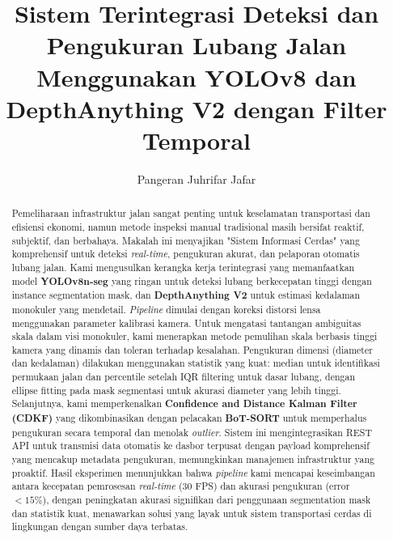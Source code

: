 \documentclass{iopjournal}
\begin{document}

\title{Sistem Terintegrasi Deteksi dan Pengukuran Lubang Jalan Menggunakan YOLOv8 dan DepthAnything V2 dengan Filter Temporal}

\author{Pangeran Juhrifar Jafar}


\begin{abstract}
Pemeliharaan infrastruktur jalan sangat penting untuk keselamatan transportasi dan efisiensi ekonomi, namun metode inspeksi manual tradisional masih bersifat reaktif, subjektif, dan berbahaya. Makalah ini menyajikan "Sistem Informasi Cerdas" yang komprehensif untuk deteksi \textit{real-time}, pengukuran akurat, dan pelaporan otomatis lubang jalan. Kami mengusulkan kerangka kerja terintegrasi yang memanfaatkan model \textbf{YOLOv8n-seg} yang ringan untuk deteksi lubang berkecepatan tinggi dengan instance segmentation mask, dan \textbf{DepthAnything V2} untuk estimasi kedalaman monokuler yang mendetail. \textit{Pipeline} dimulai dengan koreksi distorsi lensa menggunakan parameter kalibrasi kamera. Untuk mengatasi tantangan ambiguitas skala dalam visi monokuler, kami menerapkan metode pemulihan skala berbasis tinggi kamera yang dinamis dan toleran terhadap kesalahan. Pengukuran dimensi (diameter dan kedalaman) dilakukan menggunakan statistik yang kuat: median untuk identifikasi permukaan jalan dan percentile setelah IQR filtering untuk dasar lubang, dengan ellipse fitting pada mask segmentasi untuk akurasi diameter yang lebih tinggi. Selanjutnya, kami memperkenalkan \textbf{Confidence and Distance Kalman Filter (CDKF)} yang dikombinasikan dengan pelacakan \textbf{BoT-SORT} untuk memperhalus pengukuran secara temporal dan menolak \textit{outlier}. Sistem ini mengintegrasikan REST API untuk transmisi data otomatis ke dasbor terpusat dengan payload komprehensif yang mencakup metadata pengukuran, memungkinkan manajemen infrastruktur yang proaktif. Hasil eksperimen menunjukkan bahwa \textit{pipeline} kami mencapai keseimbangan antara kecepatan pemrosesan \textit{real-time} (30 FPS) dan akurasi pengukuran (error $< 15\%$), dengan peningkatan akurasi signifikan dari penggunaan segmentation mask dan statistik kuat, menawarkan solusi yang layak untuk sistem transportasi cerdas di lingkungan dengan sumber daya terbatas.
\end{abstract}
\end{document}
